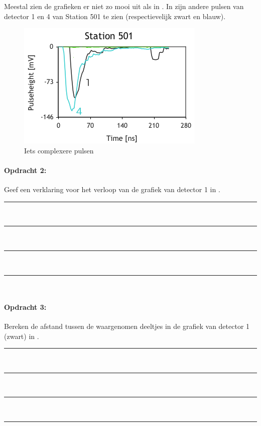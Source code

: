 \bigskip{}


Meestal zien de grafieken er niet zo mooi uit als in
. In 
zijn andere pulsen van detector 1 en 4 van Station 501 te zien
(respectievelijk zwart en blauw).

\begin{figure}[ht]
    \centering
    \includegraphics[scale=0.65]{Figures/Traces501}
    \caption{Iets complexere pulsen}
    \label{fig:Iets-complexere-pulsen}
\end{figure}


\begin{minipage}[t]{1\columnwidth}%

\paragraph{Opdracht 2:}

Geef een verklaring voor het verloop van de grafiek van detector
1 in .

\begin{center}
    \rule{\textwidth}{0.3mm}\\
    \rule{\textwidth}{0.3mm}\\
    \rule{\textwidth}{0.3mm}\\
    \rule{\textwidth}{0.3mm}\\
\end{center}
\end{minipage}

\bigskip{}


\begin{minipage}[t]{1\columnwidth}%

\paragraph{Opdracht 3:}

Bereken de afstand tussen de waargenomen deeltjes in de grafiek
van detector 1 (zwart) in .

\begin{center}
    \rule{\textwidth}{0.3mm}\\
    \rule{\textwidth}{0.3mm}\\
    \rule{\textwidth}{0.3mm}\\
    \rule{\textwidth}{0.3mm}\\
\end{center}
\end{minipage}


